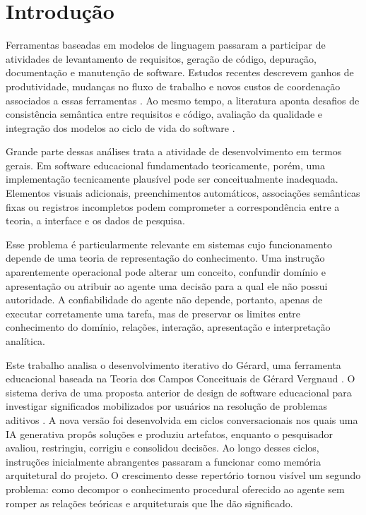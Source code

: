 \documentclass[preprint,12pt,authoryear]{elsarticle}
\newcommand{\gerard}{Gérard\xspace}
\begin{document}
\section{Introdução}
Ferramentas baseadas em modelos de linguagem passaram a participar de atividades de levantamento de requisitos, geração de código, depuração, documentação e manutenção de software. Estudos recentes descrevem ganhos de produtividade, mudanças no fluxo de trabalho e novos custos de coordenação associados a essas ferramentas \citep{ulfsnes2024transforming,song2024impact}. Ao mesmo tempo, a literatura aponta desafios de consistência semântica entre requisitos e código, avaliação da qualidade e integração dos modelos ao ciclo de vida do software \citep{zhang2024agilegen,gao2024challenges}.

Grande parte dessas análises trata a atividade de desenvolvimento em termos gerais. Em software educacional fundamentado teoricamente, porém, uma implementação tecnicamente plausível pode ser conceitualmente inadequada. Elementos visuais adicionais, preenchimentos automáticos, associações semânticas fixas ou registros incompletos podem comprometer a correspondência entre a teoria, a interface e os dados de pesquisa.

Esse problema é particularmente relevante em sistemas cujo funcionamento depende de uma teoria de representação do conhecimento. Uma instrução aparentemente operacional pode alterar um conceito, confundir domínio e apresentação ou atribuir ao agente uma decisão para a qual ele não possui autoridade. A confiabilidade do agente não depende, portanto, apenas de executar corretamente uma tarefa, mas de preservar os limites entre conhecimento do domínio, relações, interação, apresentação e interpretação analítica.

Este trabalho analisa o desenvolvimento iterativo do \gerard, uma ferramenta educacional baseada na Teoria dos Campos Conceituais de Gérard Vergnaud \citep{vergnaud1990theorie,vergnaud1991nino,vergnaud1997nature,vergnaud1998representation}. O sistema deriva de uma proposta anterior de design de software educacional para investigar significados mobilizados por usuários na resolução de problemas aditivos \citep{braga2008design}. A nova versão foi desenvolvida em ciclos conversacionais nos quais uma IA generativa propôs soluções e produziu artefatos, enquanto o pesquisador avaliou, restringiu, corrigiu e consolidou decisões. Ao longo desses ciclos, instruções inicialmente abrangentes passaram a funcionar como memória arquitetural do projeto. O crescimento desse repertório tornou visível um segundo problema: como decompor o conhecimento procedural oferecido ao agente sem romper as relações teóricas e arquiteturais que lhe dão significado.
\end{document}
